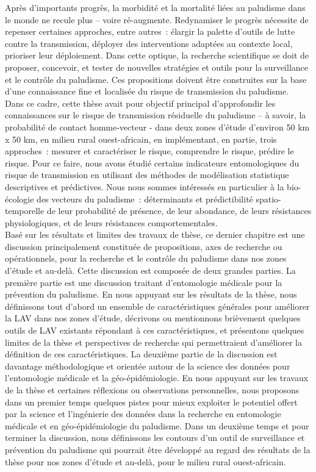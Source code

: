 \documentclass[12pt,twoside]{reedthesis}
\begin{document}
Après d'importants progrès, la morbidité et la mortalité liées au paludisme dans le monde ne recule plus -- voire ré-augmente. Redynamiser le progrès nécessite de repenser certaines approches, entre autres~: élargir la palette d'outils de lutte contre la transmission, déployer des interventions adaptées au contexte local, prioriser leur déploiement. Dans cette optique, la recherche scientifique se doit de proposer, concevoir, et tester de nouvelles stratégies et outils pour la surveillance et le contrôle du paludisme. Ces propositions doivent être construites sur la base d'une connaissance fine et localisée du risque de transmission du paludisme.\\

Dans ce cadre, cette thèse avait pour objectif principal d'approfondir les connaissances sur le risque de transmission résiduelle du paludisme -- à savoir, la probabilité de contact homme-vecteur - dans deux zones d'étude d'environ 50 km x 50 km, en milieu rural ouest-africain, en implémentant, en partie, trois approches~: mesurer et caractériser le risque, comprendre le risque, prédire le risque. Pour ce faire, nous avons étudié certains indicateurs entomologiques du risque de transmission en utilisant des méthodes de modélisation statistique descriptives et prédictives. Nous nous sommes intéressés en particulier à la bio-écologie des vecteurs du paludisme~: déterminants et prédictibilité spatio-temporelle de leur probabilité de présence, de leur abondance, de leurs résistances physiologiques, et de leurs résistances comportementales.\\

Basé sur les résultats et limites des travaux de thèse, ce dernier chapitre est une discussion principalement constituée de propositions, axes de recherche ou opérationnels, pour la recherche et le contrôle du paludisme dans nos zones d'étude et au-delà. Cette discussion est composée de deux grandes parties. La première partie est une discussion traitant d'entomologie médicale pour la prévention du paludisme. En nous appuyant sur les résultats de la thèse, nous définissons tout d'abord un ensemble de caractéristiques générales pour améliorer la LAV dans nos zones d'étude, décrivons ou mentionnons brièvement quelques outils de LAV existants répondant à ces caractéristiques, et présentons quelques limites de la thèse et perspectives de recherche qui permettraient d'améliorer la définition de ces caractéristiques. La deuxième partie de la discussion est davantage méthodologique et orientée autour de la science des données pour l'entomologie médicale et la géo-épidémiologie. En nous appuyant sur les travaux de la thèse et certaines réflexions ou observations personnelles, nous proposons dans un premier temps quelques pistes pour mieux exploiter le potentiel offert par la science et l'ingénierie des données dans la recherche en entomologie médicale et en géo-épidémiologie du paludisme. Dans un deuxième temps et pour terminer la discussion, nous définissons les contours d'un outil de surveillance et prévention du paludisme qui pourrait être développé au regard des résultats de la thèse pour nos zones d'étude et au-delà, pour le milieu rural ouest-africain.
\end{document}
